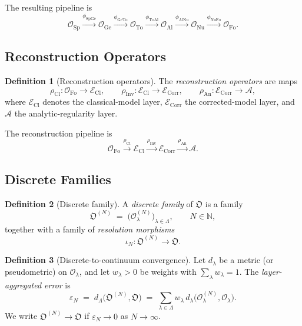 \documentclass[11pt,a4paper]{article}
\theoremstyle{definition}
\newtheorem{definition}{Definition}[section]
\theoremstyle{plain}
\newcommand{\Lam}{\Lambda}
\newcommand{\Sp}{\mathrm{Sp}}
\newcommand{\Ge}{\mathrm{Ge}}
\newcommand{\To}{\mathrm{To}}
\newcommand{\Al}{\mathrm{Al}}
\newcommand{\Nu}{\mathrm{Nu}}
\newcommand{\Fo}{\mathrm{Fo}}
\newcommand{\Cl}{\mathrm{Cl}}
\newcommand{\Corr}{\mathrm{Corr}}
\newcommand{\Inv}{\mathrm{Inv}}
\newcommand{\An}{\mathrm{An}}
\newcommand{\Ob}{\mathfrak{O}}
\newcommand{\Ecal}{\mathcal{E}}
\newcommand{\Ocal}{\mathcal{O}}
\newcommand{\Acal}{\mathcal{A}}
\begin{document}
The resulting pipeline is
\begin{equation}\label{eq:pipeline}
  \Ocal_\Sp
  \xrightarrow{\phi_{\Sp\Ge}}
  \Ocal_\Ge
  \xrightarrow{\phi_{\Ge\To}}
  \Ocal_\To
  \xrightarrow{\phi_{\To\Al}}
  \Ocal_\Al
  \xrightarrow{\phi_{\Al\Nu}}
  \Ocal_\Nu
  \xrightarrow{\phi_{\Nu\Fo}}
  \Ocal_\Fo .
\end{equation}

\subsection{Reconstruction Operators}

\begin{definition}[Reconstruction operators]
The \emph{reconstruction operators} are maps
\[
  \rho_\Cl    : \Ocal_\Fo \to \Ecal_\Cl, \qquad
  \rho_\Inv   : \Ecal_\Cl \to \Ecal_\Corr, \qquad
  \rho_\An    : \Ecal_\Corr \to \Acal,
\]
where $\Ecal_\Cl$ denotes the classical-model layer, $\Ecal_\Corr$ the
corrected-model layer, and $\Acal$ the analytic-regularity layer.
\end{definition}

The reconstruction pipeline is
\begin{equation}\label{eq:reconstruction}
  \Ocal_\Fo
  \xrightarrow{\rho_\Cl}
  \Ecal_\Cl
  \xrightarrow{\rho_\Inv}
  \Ecal_\Corr
  \xrightarrow{\rho_\An}
  \Acal .
\end{equation}

\subsection{Discrete Families}

\begin{definition}[Discrete family]
A \emph{discrete family} of $\Ob$ is a family
\[
  \Ob^{(N)} \;=\; \bigl(\Ocal^{(N)}_\lambda\bigr)_{\lambda \in \Lam},
  \qquad N \in \mathbb{N},
\]
together with a family of \emph{resolution morphisms}
\[
  \iota_N : \Ob^{(N)} \to \Ob .
\]
\end{definition}

\begin{definition}[Discrete-to-continuum convergence]
Let $d_\lambda$ be a metric (or pseudometric) on $\Ocal_\lambda$, and
let $w_\lambda > 0$ be weights with $\sum_\lambda w_\lambda = 1$. The
\emph{layer-aggregated error} is
\begin{equation}\label{eq:error}
  \varepsilon_N
  \;=\;
  d_\Lam\bigl(\Ob^{(N)}, \Ob\bigr)
  \;=\;
  \sum_{\lambda \in \Lam} w_\lambda \,
  d_\lambda\bigl(\Ocal^{(N)}_\lambda, \Ocal_\lambda\bigr).
\end{equation}
We write $\Ob^{(N)} \to \Ob$ if $\varepsilon_N \to 0$ as
$N \to \infty$.
\end{definition}
\end{document}
